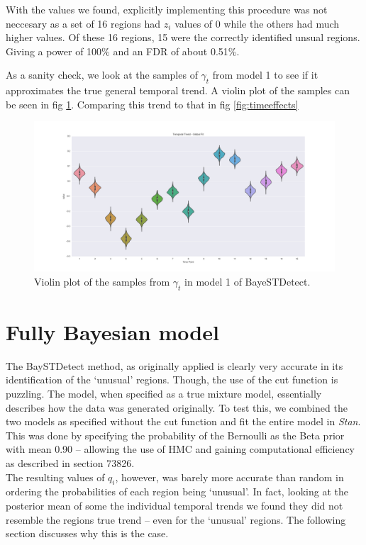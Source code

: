 \documentclass[11pt]{report}
\begin{document}
With the values we found, explicitly implementing this procedure was not neccesary as a set of 16 regions had $z_i$ values of 0 while the others had much higher values. Of these 16 regions, 15 were the correctly identified unsual regions. Giving a power of 100\% and an FDR of about 0.51\%.

As a sanity check, we look at the samples of $\gamma_t$ from model 1 to see if it approximates the true general temporal trend. A violin plot of the samples can be seen in fig \ref{fig:temporaltrend}. Comparing this trend to that in fig \ref{fig:timeeffects}
\begin{figure}
\centering
\label{fig:temporaltrend}
\includegraphics[width=\textwidth]{global_temporal}
\caption{Violin plot of the samples from $\gamma_t$ in model 1 of BayeSTDetect.}
\end{figure}

\section{Fully Bayesian model}

The BaySTDetect method, as originally applied is clearly very accurate in its identification of the `unusual' regions. Though, the use of the cut function is puzzling. The model, when specified as a true mixture model, essentially describes how the data was generated originally. To test this, we combined the two models as specified without the cut function and fit the entire model in \emph{Stan}. This was done by specifying the probability of the Bernoulli as the Beta prior with mean 0.90 -- allowing the use of HMC and gaining computational efficiency as described in section 73826. \\

The resulting values of $q_i$, however, was barely more accurate than random in ordering the probabilities of each region being `unusual'. In fact, looking at the posterior mean of some the individual temporal trends we found they did not resemble the regions true trend -- even for the `unusual' regions. The following section discusses why this is the case.
\end{document}

